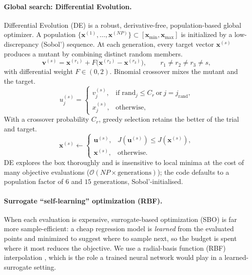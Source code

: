 \documentclass{article}
\newcommand{\xv}{\bm{x}}
\begin{document}
\paragraph{Global search: Differential Evolution.}
Differential Evolution (DE) \citep{Storn1997} is a robust, derivative-free,
population-based global optimizer. A population
$\{\xv^{(1)},\dots,\xv^{(NP)}\}\subset[\xv_{\min},\xv_{\max}]$ is initialized by a
low-discrepancy (Sobol') sequence. At each generation, every target vector
$\xv^{(s)}$ produces a mutant by combining distinct random members.
\begin{equation}
  \bm{v}^{(s)}=\xv^{(r_1)}+F\big(\xv^{(r_2)}-\xv^{(r_3)}\big),
  \qquad r_1\ne r_2\ne r_3\ne s,
  \label{eq:de-mut}
\end{equation}
with differential weight $F\in(0,2)$. Binomial crossover mixes the mutant and the target.
\begin{equation}
  u^{(s)}_j=
  \begin{cases}
    v^{(s)}_j, & \text{if } \mathrm{rand}_j\le C_r \ \text{or}\ j=j_{\mathrm{rand}},\\
    x^{(s)}_j, & \text{otherwise,}
  \end{cases}
  \label{eq:de-cross}
\end{equation}
With a crossover probability $C_r$, greedy selection retains the better of the trial
and target.
\begin{equation}
  \xv^{(s)}\leftarrow
  \begin{cases}
    \bm{u}^{(s)}, & J(\bm{u}^{(s)})\le J(\xv^{(s)}),\\
    \xv^{(s)},    & \text{otherwise.}
  \end{cases}
  \label{eq:de-sel}
\end{equation}
DE explores the box thoroughly and is insensitive to local minima at the cost of
many objective evaluations ($\mathcal{O}(NP\times\text{generations})$); the code
defaults to a population factor of $6$ and $15$ generations, Sobol'-initialised.

\paragraph{Surrogate ``self-learning'' optimization (RBF).}
When each evaluation is expensive, surrogate-based optimization (SBO)
\citep{Jones1998,Forrester2009} is far more sample-efficient: a cheap regression
model is \emph{learned} from the evaluated points and minimized to suggest where
to sample next, so the budget is spent where it most reduces the objective. We use
a radial-basis function (RBF) interpolation \citep{Hardy1971,Wendland2004,Gutmann2001},
which is the role a trained neural network would play in a learned-surrogate setting.
\end{document}
